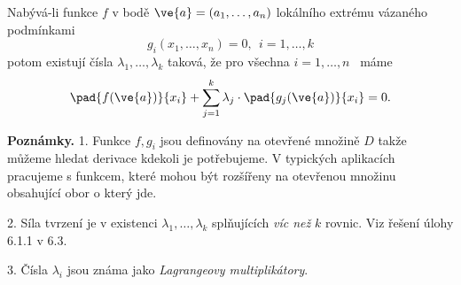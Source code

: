 \documentclass[12pt]{article}
\begin{document}
{{Nabývá-li funkce $f$ v bodě
$\ve{a}=(a_1,\dots,a_n)$ lokálního extrému vázaného podmínkami
 $$
 g_i(x_1,\dots,x_n)=0,\ \ i=1,\dots,k 
 $$
 potom existují čísla $\lambda_1,\dots,\lambda_k$ 
 taková, že pro všechna
 $i=1,\dots,n$ \  máme
 $$
 \pad{f(\ve{a})}{x_i}+\sum_{j=1}^k\lambda_j\cdot\pad{g_j(\ve{a})}{x_i}=0.
 $$}
 
 \medskip
 
 {\bf Poznámky.} 1. Funkce $f,g_i$ jsou definovány na otevřené množině
 $D$ takže můžeme hledat derivace kdekoli je potřebujeme. 
V typických aplikacích pracujeme s funkcem, které mohou být rozšířeny 
na otevřenou množinu obsahující obor o který jde.
 
 2. Síla tvrzení je v existenci
$\lambda_1,\dots,\lambda_k$ splňujících {\em víc než} $k$ rovnic.
Viz řešení úlohy 6.1.1 v 6.3.
 
 3. Čísla $\lambda_i$ jsou známa jako {\em Lagrangeovy multiplikátory}.
 
 \medskip
 
}
\end{document}
